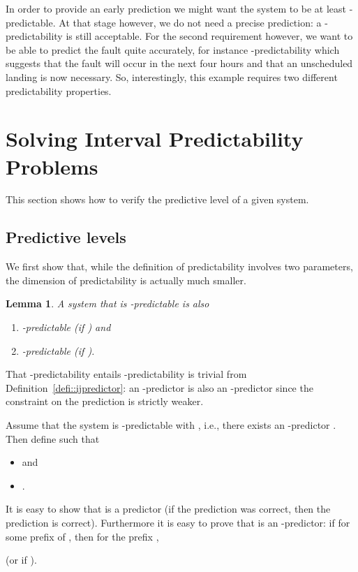 \documentclass{article}
\newtheorem{lemm}{Lemma}
\newenvironment{proof}{\par\noindent{\bf Proof}}{\hspace{\stretch{1}}}
\begin{document}
In order to provide an early prediction 
we might want the system to be at least -predictable.  
At that stage however, we do not need a precise prediction: 
a -predictability is still acceptable.  
For the second requirement however, 
we want to be able to predict the fault quite accurately, 
for instance -predictability
which suggests that the fault will occur in the next four hours 
and that an unscheduled landing is now necessary.  
So, interestingly, this example requires 
two different predictability properties.  

\section{Solving Interval Predictability Problems}
\label{sec::solution}
This section shows how to verify the predictive level 
of a given system.  

\subsection{Predictive levels}

We first show that, 
while the definition of predictability involves two parameters, 
the dimension of predictability is actually much smaller.  

\begin{lemm}\label{lemm::pred->pred}
  A system that is -predictable 
  is also 
  \begin{enumerate}
  \item 
    -predictable (if ) 
    and
  \item 
    -predictable (if ). 
  \end{enumerate}
\end{lemm}

\begin{proof}
  That -predictability entails -predictability 
  is trivial from Definition~\ref{defi::ijpredictor}: 
  an -predictor is also an -predictor 
  since the constraint on the prediction is strictly weaker.  

  Assume that the system is -predictable with , 
  i.e., there exists an -predictor .  
  Then define  such that 
  \begin{itemize}
  \item  and 
  \item .  
  \end{itemize}  
  It is easy to show that  is a predictor 
  (if the prediction  was correct, 
  then the prediction  is correct).  
  Furthermore it is easy to prove that  is an -predictor: 
  if  for some prefix  of , 
  then for the prefix , 
   
  (or  if ).  
\end{proof}
\end{document}
